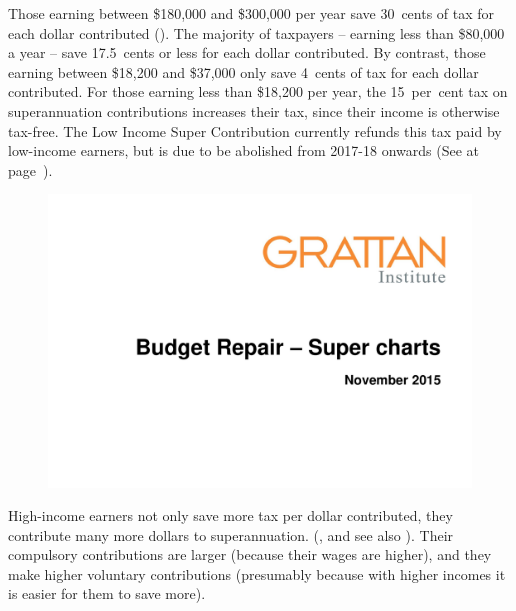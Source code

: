 Those earning between \$180,000 and \$300,000 per year save 30~cents of tax for each dollar contributed ().  The majority of taxpayers – earning less than \$80,000 a year – save 17.5~cents or less for each dollar contributed. By contrast, those earning between \$18,200 and \$37,000 only save 4~cents of tax for each dollar contributed.  For those earning less than \$18,200 per year, the 15~per~cent tax on superannuation contributions increases their tax, since their income is otherwise tax-free. The Low Income Super Contribution currently refunds this tax paid by low-income earners, but is due to be abolished from 2017-18 onwards (See  at page~\pageref{sec:SUPER-LISC-to-be-abolished}).

\begin{figure}
\label{fig:SUPER-4-2}
\includegraphics[width=\columnwidth,page=20]{super-atlas/PPTX.pdf}

\end{figure}

High-income earners not only save more tax per dollar contributed, they contribute many more dollars to superannuation. (, and see also ). Their compulsory contributions are larger (because their wages are higher), and they make higher voluntary contributions (presumably because with higher incomes it is easier for them to save more). 

